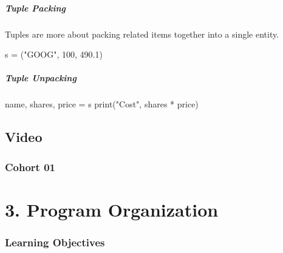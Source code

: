 \documentclass[
  letterpaper,
  DIV=11,
  numbers=noendperiod]{scrreprt}
\newenvironment{Shaded}{\begin{snugshade}}{\end{snugshade}}
\newcommand{\BuiltInTok}[1]{\textcolor[rgb]{0.00,0.46,0.62}{#1}}
\newcommand{\DecValTok}[1]{\textcolor[rgb]{0.68,0.00,0.00}{#1}}
\newcommand{\FloatTok}[1]{\textcolor[rgb]{0.68,0.00,0.00}{#1}}
\newcommand{\NormalTok}[1]{\textcolor[rgb]{0.00,0.46,0.62}{#1}}
\newcommand{\OperatorTok}[1]{\textcolor[rgb]{0.37,0.37,0.37}{#1}}
\newcommand{\StringTok}[1]{\textcolor[rgb]{0.13,0.47,0.30}{#1}}
\begin{document}
\hypertarget{tuple-packing}{%
\subsubsection{Tuple Packing}\label{tuple-packing}}

Tuples are more about packing related items together into a single
entity.

\begin{Shaded}
\begin{Highlighting}[]
\NormalTok{s }\OperatorTok{=}\NormalTok{ (}\StringTok{"GOOG"}\NormalTok{, }\DecValTok{100}\NormalTok{, }\FloatTok{490.1}\NormalTok{)}
\end{Highlighting}
\end{Shaded}

\hypertarget{tuple-unpacking}{%
\subsubsection{Tuple Unpacking}\label{tuple-unpacking}}

\begin{Shaded}
\begin{Highlighting}[]
\NormalTok{name, shares, price }\OperatorTok{=}\NormalTok{ s}
\BuiltInTok{print}\NormalTok{(}\StringTok{"Cost"}\NormalTok{, shares }\OperatorTok{*}\NormalTok{ price)}
\end{Highlighting}
\end{Shaded}

\hypertarget{video-1}{%
\chapter{Video}\label{video-1}}

\hypertarget{cohort-01-1}{%
\section{Cohort 01}\label{cohort-01-1}}

\part{3. Program Organization}

\hypertarget{learning-objectives-2}{%
\section*{Learning Objectives}\label{learning-objectives-2}}
\end{document}
